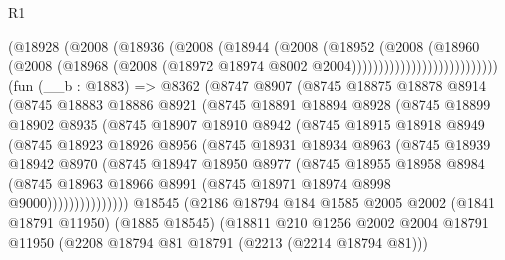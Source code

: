 \begin{lexlean}{R1}
\begin{coremodule}
                                (@18928
                                  (@2008
                                    (@18936
                                      (@2008
                                        (@18944
                                          (@2008
                                            (@18952
                                              (@2008
                                                (@18960
                                                  (@2008
                                                    (@18968
                                                      (@2008
                                                        (@18972
                                                          @18974
                                                          @8002
                                                          @2004)))))))))))))))))))))))))))
    (fun (__b : @1883) =>
    @8362
      (@8747
        @8907
        (@8745
          @18875
          @18878
          @8914
          (@8745
            @18883
            @18886
            @8921
            (@8745
              @18891
              @18894
              @8928
              (@8745
                @18899
                @18902
                @8935
                (@8745
                  @18907
                  @18910
                  @8942
                  (@8745
                    @18915
                    @18918
                    @8949
                    (@8745
                      @18923
                      @18926
                      @8956
                      (@8745
                        @18931
                        @18934
                        @8963
                        (@8745
                          @18939
                          @18942
                          @8970
                          (@8745
                            @18947
                            @18950
                            @8977
                            (@8745
                              @18955
                              @18958
                              @8984
                              (@8745
                                @18963
                                @18966
                                @8991
                                (@8745 @18971 @18974 @8998 @9000)))))))))))))))
    @18545
    (@2186
      @18794
      @184
      @1585
      @2005
      @2002
      (@1841 @18791 @11950)
      (@1885 @18545)
      (@18811
        @210
        @1256
        @2002
        @2004
        @18791
        @11950
        (@2208 @18794 @81 @18791 (@2213 (@2214 @18794 @81)))

\end{coremodule}
\end{lexlean}

